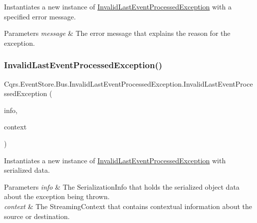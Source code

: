 Instantiates a new instance of \hyperlink{classCqrs_1_1EventStore_1_1Bus_1_1InvalidLastEventProcessedException}{Invalid\+Last\+Event\+Processed\+Exception} with a specified error message. 


\begin{DoxyParams}{Parameters}
{\em message} & The error message that explains the reason for the exception.\\
\hline
\end{DoxyParams}
\mbox{\label{classCqrs_1_1EventStore_1_1Bus_1_1InvalidLastEventProcessedException_aa14bdf5c6f8c0227dd3919b1fed91417_aa14bdf5c6f8c0227dd3919b1fed91417}} 
\subsubsection{\texorpdfstring{Invalid\+Last\+Event\+Processed\+Exception()}{InvalidLastEventProcessedException()}\hspace{0.1cm}{\footnotesize\ttfamily [4/4]}}
{\footnotesize\ttfamily Cqrs.\+Event\+Store.\+Bus.\+Invalid\+Last\+Event\+Processed\+Exception.\+Invalid\+Last\+Event\+Processed\+Exception (\begin{DoxyParamCaption}\item[{Serialization\+Info}]{info,  }\item[{Streaming\+Context}]{context }\end{DoxyParamCaption})\hspace{0.3cm}{\ttfamily [protected]}}



Instantiates a new instance of \hyperlink{classCqrs_1_1EventStore_1_1Bus_1_1InvalidLastEventProcessedException}{Invalid\+Last\+Event\+Processed\+Exception} with serialized data. 


\begin{DoxyParams}{Parameters}
{\em info} & The Serialization\+Info that holds the serialized object data about the exception being thrown.\\
\hline
{\em context} & The Streaming\+Context that contains contextual information about the source or destination.\\
\hline
\end{DoxyParams}
